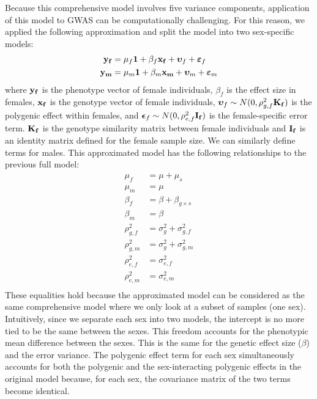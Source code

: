 \documentclass[11pt]{article}
\begin{document}
Because this comprehensive model involves five variance components, application of this model to GWAS can be computationally challenging. 
For this reason, we applied the following approximation and
split the model into two sex-specific models:
\begin{align}
    {\bf y_f} &= \mu_f {\bf 1} + \beta_f {\bf x_f} + \bm{\upsilon}_f + {\bm \varepsilon}_f \label{eq:approxf}\\
    {\bf y_m} &= \mu_m {\bf 1} + \beta_m {\bf x_m} + \bm{\upsilon}_m + {\bm \varepsilon}_m \nonumber
 \end{align}
where ${\bf y_f}$ is the phenotype vector of female individuals, $\beta_f$ is the effect size in females, ${\bf x_f}$ is the 
genotype vector of female individuals, $\bm{\upsilon}_f \sim N(0, \rho^2_{g,f} \bf{K_f})$ is the polygenic effect within females,
and $\bm{\epsilon}_f \sim N(0, \rho_{e,f}^2 \bf{I_f})$ is the female-specific error term. 
$\bf{K_f}$ is the genotype similarity matrix between female individuals and
$\bf{I_f}$ is an identity matrix defined for the female sample size.
We can similarly define terms for males.
This approximated model has the following relationships to the previous full model:
\begin{align*}
\mu_f &= \mu + \mu_s \\
    \mu_m &= \mu \\
    \beta_f &= \beta + \beta_{g\times s}\\
    \beta_m &= \beta\\
    \rho^2_{g,f} &= \sigma^2_g + \sigma^2_{g,f}\\
    \rho^2_{g,m} &= \sigma^2_g + \sigma^2_{g,m}\\
    \rho^2_{e,f} &= \sigma^2_{e,f}\\
    \rho^2_{e,m} &= \sigma^2_{e,m}\\
\end{align*}
These equalities hold because the approximated model can be considered as the same comprehensive model where
we only look at a subset of samples (one sex).
Intuitively, since we separate each sex into two models, 
the intercept is no more tied to be the same between the sexes.
This freedom accounts for the phenotypic mean difference between the sexes. %
This is the same for the genetic effect size ($\beta$) and the error variance.
The polygenic effect term for each sex simultaneously accounts for both the polygenic and the sex-interacting polygenic effects in the original model
because, for each sex, the covariance matrix of the two terms become identical.
\end{document}
